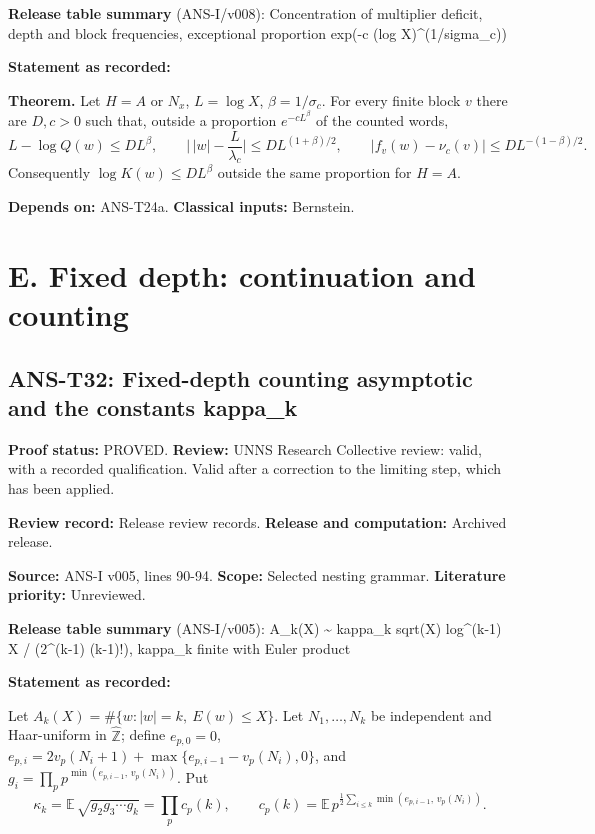 \documentclass[
  11pt,
]{article}
\begin{document}
\textbf{Release table summary} (ANS-I/v008): Concentration of multiplier
deficit, depth and block frequencies, exceptional proportion exp(-c (log
X)\^{}(1/sigma\_c))

\textbf{Statement as recorded:}

\textbf{Theorem.} Let \(H=A\) or \(N_x\), \(L=\log X\),
\(\beta=1/\sigma_c\). For every finite block \(v\) there are \(D,c>0\)
such that, outside a proportion \(e^{-cL^\beta}\) of the counted words,
\[L-\log Q(w)\le DL^\beta,\qquad\Big|\,|w|-\frac L{\lambda_c}\Big|\le DL^{(1+\beta)/2},\qquad|f_v(w)-\nu_c(v)|\le DL^{-(1-\beta)/2}.\]
Consequently \(\log K(w)\le DL^\beta\) outside the same proportion for
\(H=A\).

\textbf{Depends on:} ANS-T24a. \textbf{Classical inputs:} Bernstein.

\hypertarget{e.-fixed-depth-continuation-and-counting}{%
\section{E. Fixed depth: continuation and
counting}\label{e.-fixed-depth-continuation-and-counting}}

\hypertarget{ans-t32-fixed-depth-counting-asymptotic-and-the-constants-kappa_k}{%
\subsection{ANS-T32: Fixed-depth counting asymptotic and the constants
kappa\_k}\label{ans-t32-fixed-depth-counting-asymptotic-and-the-constants-kappa_k}}

\textbf{Proof status:} PROVED. \textbf{Review:} UNNS Research Collective
review: valid, with a recorded qualification. Valid after a correction
to the limiting step, which has been applied.

\textbf{Review record:} Release review records. \textbf{Release and
computation:} Archived release.

\textbf{Source:} ANS-I v005, lines 90-94. \textbf{Scope:} Selected
nesting grammar. \textbf{Literature priority:} Unreviewed.

\textbf{Release table summary} (ANS-I/v005): A\_k(X) \textasciitilde{}
kappa\_k sqrt(X) log\^{}(k-1) X / (2\^{}(k-1) (k-1)!), kappa\_k finite
with Euler product

\textbf{Statement as recorded:}

Let \(A_k(X)=\#\{w:|w|=k,\ E(w)\le X\}\). Let \(N_1,\dots,N_k\) be
independent and Haar-uniform in \(\hat{\mathbb Z}\); define
\(e_{p,0}=0\), \(e_{p,i}=2v_p(N_i+1)+\max\{e_{p,i-1}-v_p(N_i),0\}\), and
\(g_i=\prod_pp^{\min(e_{p,i-1},\,v_p(N_i))}\). Put
\[\kappa_k=\mathbb E\,\sqrt{g_2g_3\cdots g_k}=\prod_pc_p(k),\qquad c_p(k)=\mathbb E\,p^{\frac12\sum_{i\le k}\min(e_{p,i-1},\,v_p(N_i))}.\]
\end{document}
